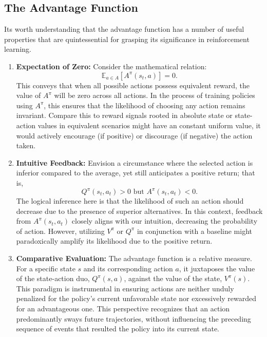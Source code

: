 \subsection{The Advantage Function}
Its worth understanding that the advantage function has a number of useful properties that are quintessential for grasping its significance in reinforcement learning.  

\begin{enumerate}
    \item \textbf{Expectation of Zero:} Consider the mathematical relation:
    \[
    \mathbb{E}_{a \in A} [A^{\pi}(s_t,a)] = 0.
    \]
    This conveys that when all possible actions possess equivalent reward, the value of \(A^{\pi}\) will be zero across all actions. In the process of training policies using \(A^{\pi}\), this ensures that the likelihood of choosing any action remains invariant. Compare this to reward signals rooted in absolute state or state-action values in equivalent scenarios might have an constant uniform value, it would actively encourage (if positive) or discourage (if negative) the action taken.

    \item \textbf{Intuitive Feedback:} Envision a circumstance where the selected action is inferior compared to the average, yet still anticipates a positive return; that is, 
    \[
    Q^{\pi}(s_t,a_t) > 0 \text{ but } A^{\pi}(s_t, a_t) < 0.
    \]
    The logical inference here is that the likelihood of such an action should decrease due to the presence of superior alternatives. In this context, feedback from \(A^{\pi}(s_t, a_t)\) closely aligns with our intuition, decreasing the probability of action. However, utilizing \(V^{\pi}\) or \(Q^{\pi}\) in conjunction with a baseline might paradoxically amplify its likelihood due to the positive return.

    \item \textbf{Comparative Evaluation:} The advantage function is a relative measure. For a specific state \(s\) and its corresponding action \(a\), it juxtaposes the value of the state-action duo, \(Q^{\pi}(s,a)\), against the value of the state, \(V^{\pi}(s)\). This paradigm is instrumental in ensuring actions are neither unduly penalized for the policy's current unfavorable state nor excessively rewarded for an advantageous one. This perspective recognizes that an action predominantly sways future trajectories, without influencing the preceding sequence of events that resulted the policy into its current state.
\end{enumerate}


